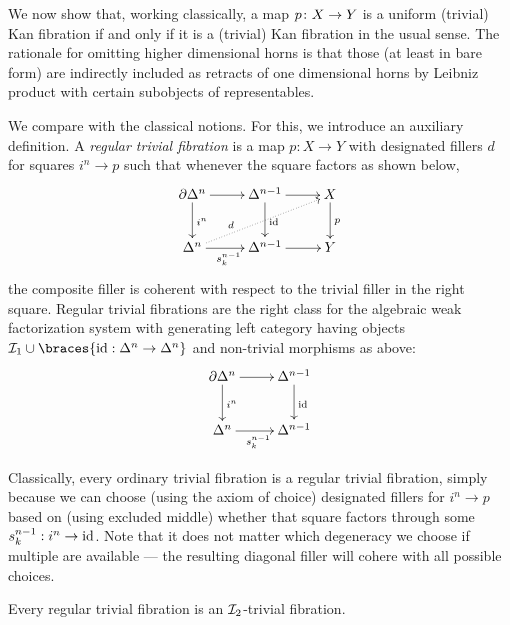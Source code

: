 \documentclass[reqno,10pt,a4paper,oneside]{amsart}
\begin{document}
We now show that, working classically, a map $p \co X \to Y$ is a uniform (trivial) Kan fibration if and only
if it is a (trivial) Kan fibration in the usual sense. 
 The rationale for omitting higher dimensional horns is that those (at least in bare form) are indirectly included as retracts of one dimensional horns by Leibniz product with certain subobjects of representables. 





We compare with the classical notions. For this, we introduce an auxiliary definition. A \emph{regular trivial fibration} is a map $p : X \to Y$ with designated fillers $d$ for squares $i^n \to p$ such that whenever the square factors as shown below,
\[
\xymatrix{
  \partial \Delta^n
  \ar[r]
  \ar[d]^{i^n}
&
  \Delta^{n-1}
  \ar[r]
  \ar[d]^{\id}
&
  X
  \ar[d]^{p}
\\
  \Delta^n
  \ar[r]_{s_k^{n-1}}
  \ar@{.>}[urr]^(0.3){d}
&
  \Delta^{n-1}
  \ar[r]
&
  Y
}
\]
the composite filler is coherent with respect to the trivial filler in the right square. Regular trivial fibrations are the right class for the algebraic weak factorization system with generating left category having objects $\cal{I}_1 \cup \braces{\id : \Delta^n \to \Delta^n}$ and non-trivial morphisms as above:
\[
\xymatrix{
  \partial \Delta^n
  \ar[r]
  \ar[d]^{i^n}
&
  \Delta^{n-1}
  \ar[d]^{\id}
\\
  \Delta^n
  \ar[r]_{s_k^{n-1}}
&
  \Delta^{n-1}
}
\]

Classically, every ordinary trivial fibration is a regular trivial fibration, simply because we can choose (using the axiom of choice) designated fillers for $i^n \to p$ based on (using excluded middle) whether that square factors through some $s_k^{n-1} : i^n \to \id$.
Note that it does not matter which degeneracy we choose if multiple are available --- the resulting diagonal filler will cohere with all possible choices.

\begin{lemma}
Every regular trivial fibration is an $\cal{I}_2$-trivial fibration.
\end{lemma}
\end{document}
